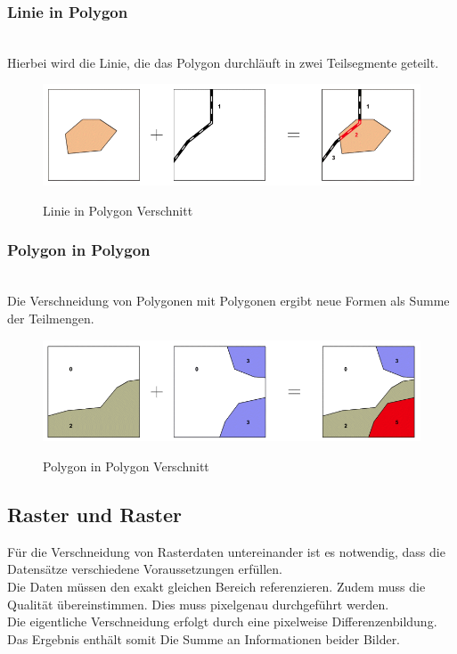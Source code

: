 \documentclass[10pt,conference,compsocconf]{IEEEtran}
\begin{document}
\subsubsection{Linie in Polygon}\hspace*{\fill} \\
Hierbei wird die Linie, die das Polygon durchläuft in zwei Teilsegmente geteilt.

\begin{figure}[H]
  \centering
  	\includegraphics[width=\columnwidth]{img/linie_in_polygon}\\
  \caption[]{Linie in Polygon Verschnitt\cite{mariuszMaster}}
  \label{img:linie_in_polygon}
\end{figure}

\subsubsection{Polygon in Polygon}\hspace*{\fill} \\
Die Verschneidung von Polygonen mit Polygonen ergibt neue Formen als Summe der Teilmengen.

\begin{figure}[H]
  \centering
  	\includegraphics[width=\columnwidth]{img/polygon_in_polygon}\\
  \caption[]{Polygon in Polygon Verschnitt\cite{mariuszMaster}}
  \label{img:polygon_in_polygon}
\end{figure}

\subsection{Raster und Raster}
Für die Verschneidung von Rasterdaten untereinander ist es notwendig, dass die Datensätze verschiedene Voraussetzungen erfüllen.\\
Die Daten müssen den exakt gleichen Bereich referenzieren. Zudem muss die Qualität übereinstimmen. Dies muss pixelgenau durchgeführt werden.\\
Die eigentliche Verschneidung erfolgt durch eine pixelweise Differenzenbildung. Das Ergebnis enthält somit Die Summe an Informationen beider Bilder.
\end{document}
